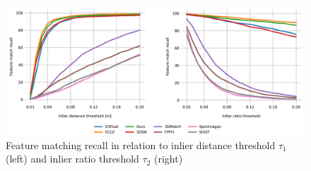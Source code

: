 \begin{figure}[t!]
    \centering
    \includegraphics[width=0.8\columnwidth]{figures/images/fmr.png}
    \caption{Feature matching recall in relation to inlier distance threshold $\tau_{1}$ (left) and inlier ratio threshold $\tau_{2}$ (right)}
    \label{fig:fmr}
\end{figure}